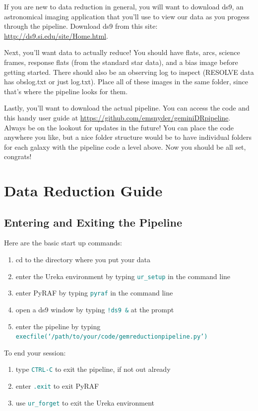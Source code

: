 \documentclass[12pt]{report}
\newcommand{\ty}[1]{\textcolor{teal}{\texttt{#1}}}
\begin{document}
If you are new to data reduction in general, you will want to download ds9, an astronomical imaging application that you'll use to view our data as you progess through the pipeline. Download ds9 from this site: \url{http://ds9.si.edu/site/Home.html}.

Next, you'll want data to actually reduce! You should have flats, arcs, science frames, response flats (from the standard star data), and a bias image before getting started. There should also be an observing log to inspect (RESOLVE data has obslog.txt or just log.txt). Place all of these images in the same folder, since that's where the pipeline looks for them. 

Lastly, you'll want to download the actual pipeline. You can access the code and this handy user guide at \url{https://github.com/emsnyder/geminiDRpipeline}. Always be on the lookout for updates in the future! You can place the code anywhere you like, but a nice folder structure would be to have individual folders for each galaxy with the pipeline code a level above. Now you should be all set, congrats!

\chapter{Data Reduction Guide}

\section{Entering and Exiting the Pipeline}
Here are the basic start up commands: 
\begin{enumerate}
\item cd to the directory where you put your data
\item enter the Ureka environment by typing \ty{ur\_setup} in the command line 
\item enter PyRAF by typing \ty{pyraf} in the command line
\item open a ds9 window by typing \ty{!ds9 \&} at the prompt
\item enter the pipeline by typing \ty{execfile(`/path/to/your/code/gemreductionpipeline.py')}
\end{enumerate}

\noindent To end your session:
\begin{enumerate}
\item type \ty{CTRL-C} to exit the pipeline, if not out already
\item enter \ty{.exit} to exit PyRAF
\item use \ty{ur\_forget} to exit the Ureka environment
\end{enumerate}
\end{document}
